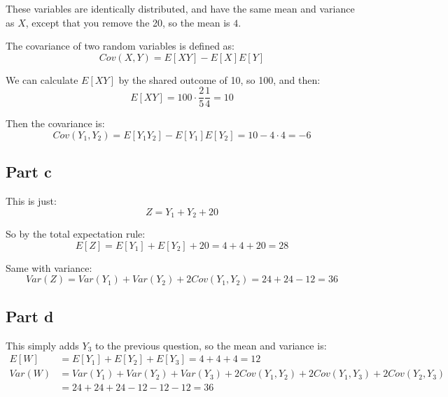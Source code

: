 These variables are identically distributed, and have the same mean and variance as $X$, except that you remove the 20, so the mean is $4$.

The covariance of two random variables is defined as:
\[
	Cov(X,Y) = E[XY] - E[X]E[Y]
\]

We can calculate $E[XY]$ by the shared outcome of 10, so 100, and then:
\[
	E[XY] = 100\cdot \frac{2}{5}\frac{1}{4} = 10
\]

Then the covariance is:
\[
	Cov(Y_1,Y_2) = E[Y_1Y_2] - E[Y_1]E[Y_2] = 10 - 4\cdot 4 = -6
\]

\subsection{Part c}

This is just:
\[
	Z = Y_1 + Y_2+20
\]

So by the total expectation rule:
\[
	E[Z] = E[Y_1] + E[Y_2] + 20 = 4 + 4 + 20 = 28
\]

Same with variance:
\[
	Var(Z) = Var(Y_1) + Var(Y_2) + 2Cov(Y_1,Y_2) = 24 + 24 - 12 = 36
\]

\subsection{Part d}

This simply adds $Y_3$ to the previous question, so the mean and variance is:
\begin{align*}
	E[W]   & = E[Y_1] + E[Y_2] + E[Y_3] = 4 + 4 + 4 = 12                                      \\
	Var(W) & = Var(Y_1) + Var(Y_2) + Var(Y_3) + 2Cov(Y_1,Y_2) + 2Cov(Y_1,Y_3) + 2Cov(Y_2,Y_3) \\
	       & = 24 + 24 + 24 - 12 - 12 - 12 = 36
\end{align*}

